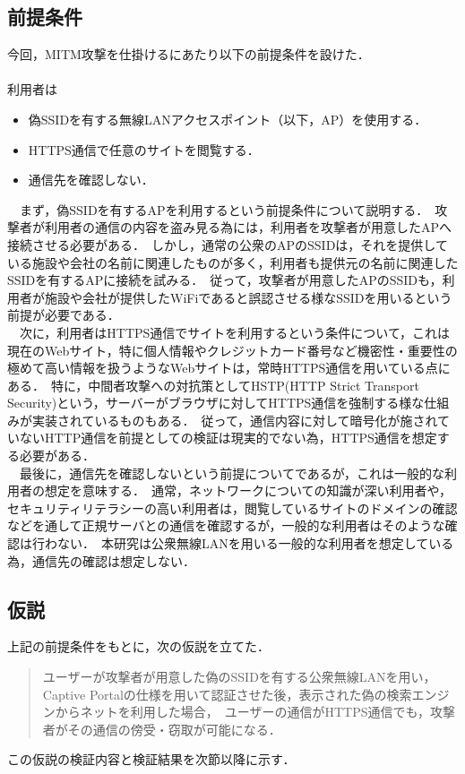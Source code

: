 \documentclass[dvipdfmx]{jsarticle}
\begin{document}
        \subsection{前提条件}
            今回，MITM攻撃を仕掛けるにあたり以下の前提条件を設けた．\\
            \\
            利用者は
            \begin{itemize}
                \item 偽SSIDを有する無線LANアクセスポイント（以下，AP）を使用する．
                \item HTTPS通信で任意のサイトを閲覧する．
                \item 通信先を確認しない．
            \end{itemize}
            　まず，偽SSIDを有するAPを利用するという前提条件について説明する．\
            攻撃者が利用者の通信の内容を盗み見る為には，利用者を攻撃者が用意したAPへ接続させる必要がある．\
            しかし，通常の公衆のAPのSSIDは，それを提供している施設や会社の名前に関連したものが多く，利用者も提供元の名前に関連したSSIDを有するAPに接続を試みる．\
            従って，攻撃者が用意したAPのSSIDも，利用者が施設や会社が提供したWiFiであると誤認させる様なSSIDを用いるという前提が必要である．\\
            　次に，利用者はHTTPS通信でサイトを利用するという条件について，これは現在のWebサイト，特に個人情報やクレジットカード番号など機密性・重要性の極めて高い情報を扱うようなWebサイトは，常時HTTPS通信を用いている点にある．\
            特に，中間者攻撃への対抗策としてHSTP(HTTP Strict Transport Security)という，サーバーがブラウザに対してHTTPS通信を強制する様な仕組みが実装されているものもある．\
            従って，通信内容に対して暗号化が施されていないHTTP通信を前提としての検証は現実的でない為，HTTPS通信を想定する必要がある．\\
            　最後に，通信先を確認しないという前提についてであるが，これは一般的な利用者の想定を意味する．\
            通常，ネットワークについての知識が深い利用者や，セキュリティリテラシーの高い利用者は，閲覧しているサイトのドメインの確認などを通して正規サーバとの通信を確認するが，一般的な利用者はそのような確認は行わない．\
            本研究は公衆無線LANを用いる一般的な利用者を想定している為，通信先の確認は想定しない．\\
        \subsection{仮説}
            上記の前提条件をもとに，次の仮説を立てた．
            \begin{quote}
                ユーザーが攻撃者が用意した偽のSSIDを有する公衆無線LANを用い，Captive Portalの仕様を用いて認証させた後，表示された偽の検索エンジンからネットを利用した場合，\
                ユーザーの通信がHTTPS通信でも，攻撃者がその通信の傍受・窃取が可能になる．
            \end{quote}
            この仮説の検証内容と検証結果を次節以降に示す．
\end{document}
